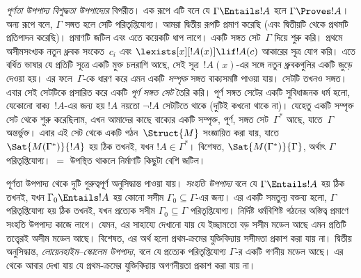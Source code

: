 \emph{পূর্ণতা উপপাদ্য} \emph{বিশুদ্ধতা উপপাদ্যের} বিপরীত।
এক রূপে এটি বলে যে $\Gamma \Entails !A$ হলে
$\Gamma \Proves !A$। অন্য রূপে বলে, $\Gamma$ সঙ্গত হলে সেটি
পরিতৃপ্তিযোগ্য। আমরা দ্বিতীয় রূপটি প্রমাণ করেছি (এবং দ্বিতীয়টি
থেকে প্রথমটি প্রতিপাদন করেছি)। প্রমাণটি জটিল এবং এতে কয়েকটি
ধাপ লাগে। একটি সঙ্গত সেট~$\Gamma$ দিয়ে শুরু করি। প্রথমে
অসীমসংখ্যক নতুন ধ্রুবক সংকেত~$c_i$ এবং
$\lexists[x][!A(x)] \lif !A(c)$ আকারের সূত্র যোগ করি। এতে
বর্ধিত ভাষার যে প্রতিটি সূত্রে একটি মুক্ত চলরাশি আছে, সেই
সূত্র~$!A(x)$-এর সঙ্গে
নতুন ধ্রুবকগুলির একটি জুড়ে দেওয়া হয়। এর ফলে~$\Gamma$-কে
ধারণ করে এমন একটি \emph{সম্পৃক্ত} সঙ্গত বাক্যসমষ্টি পাওয়া
যায়। সেটটি তখনও সঙ্গত। এবার সেই সেটটিকে প্রসারিত করে একটি
\emph{পূর্ণ সঙ্গত সেট} তৈরি করি। পূর্ণ সঙ্গত সেটের একটি সুবিধাজনক
ধর্ম হলো, যেকোনো বাক্য~$!A$-এর জন্য হয় $!A$ নয়তো $\lnot !A$
সেটটিতে থাকে (দুটিই কখনো থাকে না)। যেহেতু একটি সম্পৃক্ত সেট
থেকে শুরু করেছিলাম, এখন আমাদের কাছে বাক্যের একটি সম্পৃক্ত,
পূর্ণ, সঙ্গত সেট~$\Gamma^*$ আছে, যাতে~$\Gamma$ অন্তর্ভুক্ত।
এবার এই সেট থেকে একটি গঠন~$\Struct{M}$ সংজ্ঞায়িত করা যায়,
যাতে $\Sat{M(\Gamma^*)}{!A}$ হয় ঠিক তখনই, যখন
$!A \in \Gamma^*$। বিশেষত, $\Sat{M(\Gamma^*)}{\Gamma}$, অর্থাৎ
$\Gamma$ পরিতৃপ্তিযোগ্য। $=$ উপস্থিত থাকলে নির্মাণটি কিছুটা
বেশি জটিল।

পূর্ণতা উপপাদ্য থেকে দুটি গুরুত্বপূর্ণ অনুসিদ্ধান্ত পাওয়া যায়।
\emph{সংহতি উপপাদ্য} বলে যে $\Gamma \Entails !A$ হয় ঠিক তখনই,
যখন $\Gamma_0 \Entails !A$ হয় কোনো সসীম
$\Gamma_0 \subseteq \Gamma$-এর জন্য। এর একটি সমতুল্য বক্তব্য হলো, $\Gamma$
পরিতৃপ্তিযোগ্য হয় ঠিক তখনই, যখন প্রত্যেক সসীম
$\Gamma_0 \subseteq \Gamma$ পরিতৃপ্তিযোগ্য। নির্দিষ্ট ধর্মবিশিষ্ট
গঠনের অস্তিত্ব প্রমাণে সংহতি উপপাদ্য কাজে লাগে। যেমন, এর সাহায্যে
দেখানো যায় যে ইচ্ছামতো বড় সসীম মডেল আছে এমন প্রতিটি তত্ত্বেরই
অসীম মডেল আছে। বিশেষত, এর অর্থ হলো প্রথম-ক্রমের যুক্তিবিদ্যায়
সসীমতা প্রকাশ করা যায় না। দ্বিতীয় অনুসিদ্ধান্ত,
\emph{লোয়েনহাইম--স্কোলেম উপপাদ্য}, বলে যে প্রত্যেক পরিতৃপ্তিযোগ্য
$\Gamma$-র একটি গণনীয় মডেল আছে। এর থেকে আবার দেখা যায় যে
প্রথম-ক্রমের যুক্তিবিদ্যায় অগণনীয়তা প্রকাশ করা যায় না।
